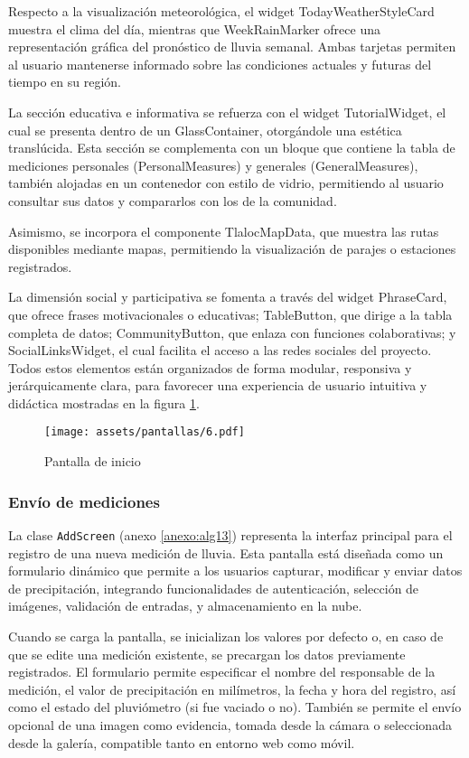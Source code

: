 Respecto a la visualización meteorológica, el widget TodayWeatherStyleCard muestra el clima del día, mientras que WeekRainMarker ofrece una representación gráfica del pronóstico de lluvia semanal. Ambas tarjetas permiten al usuario mantenerse informado sobre las condiciones actuales y futuras del tiempo en su región.

La sección educativa e informativa se refuerza con el widget TutorialWidget, el cual se presenta dentro de un GlassContainer, otorgándole una estética translúcida. Esta sección se complementa con un bloque que contiene la tabla de mediciones personales (PersonalMeasures) y generales (GeneralMeasures), también alojadas en un contenedor con estilo de vidrio, permitiendo al usuario consultar sus datos y compararlos con los de la comunidad.

Asimismo, se incorpora el componente TlalocMapData, que muestra las rutas disponibles mediante mapas, permitiendo la visualización de parajes o estaciones registrados. 

La dimensión social y participativa se fomenta a través del widget PhraseCard, que ofrece frases motivacionales o educativas; TableButton, que dirige a la tabla completa de datos;  CommunityButton, que enlaza con funciones colaborativas;  y SocialLinksWidget, el cual facilita el acceso a las redes sociales del proyecto. Todos estos elementos están organizados de forma modular, responsiva y jerárquicamente clara, para favorecer una experiencia de usuario intuitiva y didáctica mostradas en la figura \ref{pantallas6}.
\begin{figure}[h!]
\centering
  \texttt{[image: assets/pantallas/6.pdf]}
  \caption{Pantalla de inicio}
  \label{pantallas6}
\end{figure}

  

\newpage
\subsubsection*{Envío de mediciones}


La clase \texttt{AddScreen} (anexo \ref{anexo:alg13}) representa la interfaz principal para el registro de una nueva medición de lluvia. Esta pantalla está diseñada como un formulario dinámico que permite a los usuarios capturar, modificar y enviar datos de precipitación, integrando funcionalidades de autenticación, selección de imágenes, validación de entradas, y almacenamiento en la nube.

Cuando se carga la pantalla, se inicializan los valores por defecto o, en caso de que se edite una medición existente, se precargan los datos previamente registrados. El formulario permite especificar el nombre del responsable de la medición, el valor de precipitación en milímetros, la fecha y hora del registro, así como el estado del pluviómetro (si fue vaciado o no). También se permite el envío opcional de una imagen como evidencia, tomada desde la cámara o seleccionada desde la galería, compatible tanto en entorno web como móvil.


